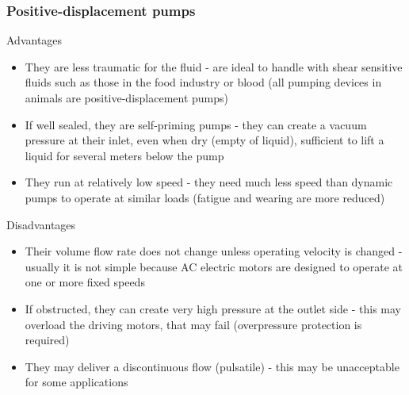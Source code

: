\documentclass[class=report, crop=false, 12pt,a4paper]{standalone}
\begin{document}
\subsubsection*{Positive-displacement pumps}
Advantages
\begin{itemize}
  \item They are less traumatic for the fluid - are ideal to handle with shear sensitive fluids such as those in the food industry or blood (all pumping devices in animals are positive-displacement pumps)
  \item If well sealed, they are self-priming pumps - they can create a vacuum pressure at their inlet, even when dry (empty of liquid), sufficient to lift a liquid for several meters below the pump
  \item They run at relatively low speed - they need much less speed than dynamic pumps to operate at similar loads (fatigue and wearing are more reduced)
\end{itemize}
Disadvantages
\begin{itemize}
  \item Their volume flow rate does not change unless operating velocity is changed - usually it is not simple because AC electric motors are designed to operate at one or more fixed speeds
  \item If obstructed, they can create very high pressure at the outlet side - this may overload the driving motors, that may fail (overpressure protection is required)
  \item They may deliver a discontinuous flow (pulsatile) - this may be unacceptable for some applications
\end{itemize}
\end{document}
